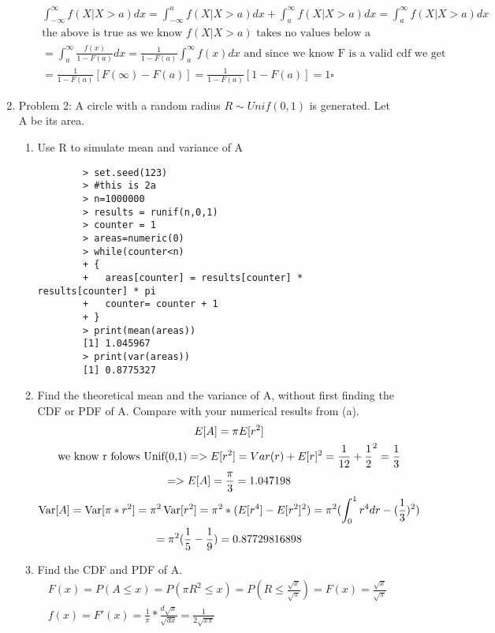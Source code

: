 \documentclass[11pt]{article}
\newcommand{\var}{\mathop{\rm Var}}
\begin{document}
\begin{enumerate}
\begin{enumerate}
\begin{gather}
		\int_{-\infty}^{\infty} f(X|X>a)dx = \int_{-\infty}^{a} f(X|X>a)dx + \int_{a}^{\infty} f(X|X>a)dx = \int_{a}^{\infty} f(X|X>a)dx\\
		\text{the above is true as we know $f(X|X>a)$ takes no values below a}
		\\
		=\int_{a}^{\infty} \frac{f(x)}{1-F(a)}dx = \frac{1}{1-F(a)}\int_{a}^{\infty} f(x)dx \text{ and since we know F is a valid cdf we get }\\
		= \frac{1}{1-F(a)}[F(\infty) -F(a)] = \frac{1}{1-F(a)}[1 -F(a)] = 1 \square 
	\end{gather}
\end{enumerate}
\item Problem 2: A circle with a random radius $R \sim Unif(0,1)$ is generated. Let A be its area.
\\
\begin{enumerate}
	\item Use R to simulate mean and variance of A
	\\
	\begin{verbatim}
		> set.seed(123)
		> #this is 2a
		> n=1000000
		> results = runif(n,0,1)
		> counter = 1
		> areas=numeric(0)
		> while(counter<n)
		+ {
		+   areas[counter] = results[counter] * results[counter] * pi
		+   counter= counter + 1
		+ }
		> print(mean(areas))
		[1] 1.045967
		> print(var(areas))
		[1] 0.8775327
	\end{verbatim}
	\item Find the theoretical mean and the variance of A, without first finding the CDF or PDF of A. Compare
	with your numerical results from (a).
	\begin{gather}
		E[A] = \pi E[r^2]\\
		\text{we know r folows Unif(0,1)} => E[r^2] = Var(r) + E[r]^2 = \frac{1}{12} + \frac{1}{2}^2 = \frac{1}{3}\\
		 => E[A] = \frac{\pi}{3} = 1.047198\\
		\var[A] = \var[\pi * r^2] = \pi^2\var[r^2] = \pi^2 * (E[r^4]-E[r^2]^2) = 
		\pi^2 (\int_{0}^{1}r^4 dr -(\frac{1}{3})^2) \\
		= \pi^2 (\frac{1}{5} -\frac{1}{9}) = 0.87729816898 
	\end{gather}
	\item Find the CDF and PDF of A.
	\begin{gather}
		F(x) = P(A \le x) = P(\pi R^2 \le x) = P(R \le \frac{\sqrt{x}}{\sqrt{\pi}})= F(x) = \frac{\sqrt{x}}{\sqrt{\pi}}\\
		f(x) = F'(x) = \frac{1}{\pi} * \frac{d\sqrt{x}}{\sqrt{dx}} = \frac{1}{2\sqrt{x \pi}}

\end{gather}
\end{enumerate}
\end{enumerate}
\end{document}
